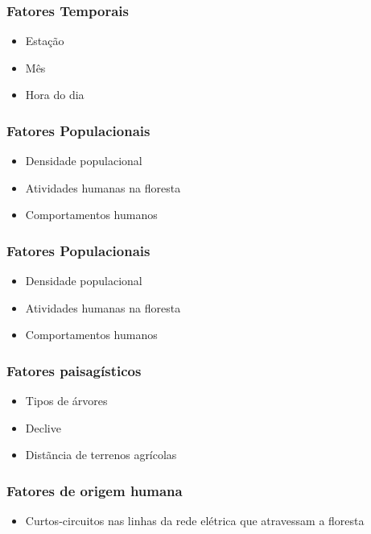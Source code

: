 \documentclass{article}
\begin{document}
\subsubsection{Fatores Temporais}
\begin{itemize}
    \item Estação
    \item Mês
    \item Hora do dia
\end{itemize}

\subsubsection{Fatores Populacionais}
\begin{itemize}
    \item Densidade populacional
    \item Atividades humanas na floresta
    \item Comportamentos humanos
\end{itemize}

\subsubsection{Fatores Populacionais}
\begin{itemize}
    \item Densidade populacional
    \item Atividades humanas na floresta
    \item Comportamentos humanos
\end{itemize}

\subsubsection{Fatores paisagísticos}
\begin{itemize}
    \item Tipos de árvores
    \item Declive
    \item Distãncia de terrenos agrícolas
\end{itemize}

\subsubsection{Fatores de origem humana}
\begin{itemize}
    \item Curtos-circuitos nas linhas da rede elétrica que atravessam a floresta
\end{itemize}
\end{document}
